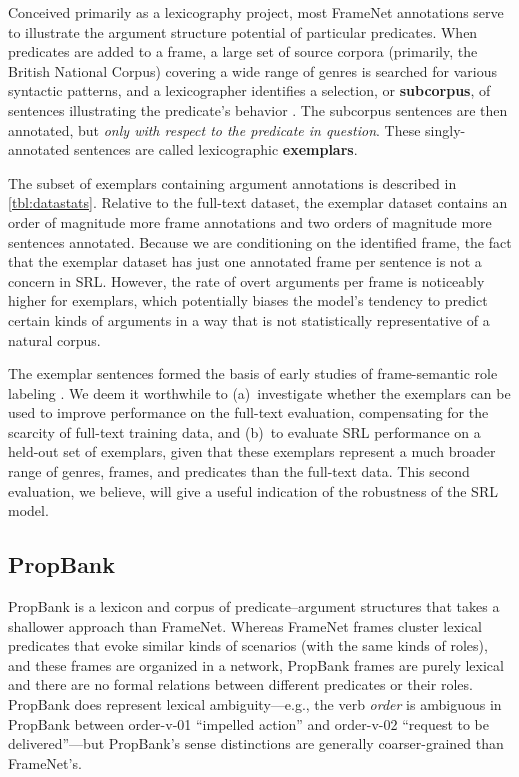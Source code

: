 \documentclass[11pt,a4paper]{article}
\newcommand{\pbf}[1]{\mbox{\textsf{#1}}} %
\begin{document}
Conceived primarily as a lexicography project, 
most FrameNet annotations serve to illustrate the argument structure potential 
of particular predicates. When predicates are added to a frame, 
a large set of source corpora (primarily, the British National Corpus) covering a wide range of genres
is searched for various syntactic patterns, 
and a lexicographer identifies a selection, or \textbf{subcorpus}, of sentences 
illustrating the predicate's behavior \citep{boas-05}.
The subcorpus sentences are then annotated, but \emph{only with respect to the predicate in question}.
These singly-annotated sentences are called lexicographic \textbf{exemplars}.

The subset of exemplars containing argument annotations is described in \cref{tbl:datastats}.
Relative to the full-text dataset, the exemplar dataset contains 
an order of magnitude more frame annotations and two orders of magnitude 
more sentences annotated.
Because we are conditioning on the identified frame, 
the fact that the exemplar dataset has just one annotated frame per sentence
is not a concern in SRL. However, the rate of overt arguments per frame 
is noticeably higher for exemplars, which potentially biases the model's 
tendency to predict certain kinds of arguments in a way that is not statistically representative of a natural corpus.

The exemplar sentences formed the basis of early studies of frame-semantic role labeling \citep[e.g.,][]{gildea-02,thompson-03,fleischman-03,kwon-04}.
We deem it worthwhile to (a)~investigate whether the exemplars 
can be used to improve performance on the full-text evaluation, 
compensating for the scarcity of full-text training data,
and (b)~to evaluate SRL performance on a held-out set of exemplars, 
given that these exemplars represent a much broader range of genres, frames, and predicates 
than the full-text data.
This second evaluation, we believe, will give a useful indication of the robustness of the SRL model.

\subsection{PropBank}\label{sec:pb}

PropBank \citep[PB;][]{palmer-05} is a lexicon and corpus of predicate--argument structures
that takes a shallower approach than FrameNet. Whereas FrameNet frames cluster 
lexical predicates that evoke similar kinds of scenarios (with the same kinds of roles), 
and these frames are organized in a network, 
PropBank frames are purely lexical and there are no formal relations between different predicates 
or their roles.
PropBank does represent lexical ambiguity---e.g., the verb \textit{order} is ambiguous 
in PropBank between \pbf{order-v-01} ``impelled action'' and \pbf{order-v-02} ``request to be delivered''---but
PropBank's sense distinctions are generally coarser-grained than FrameNet's.
\end{document}
